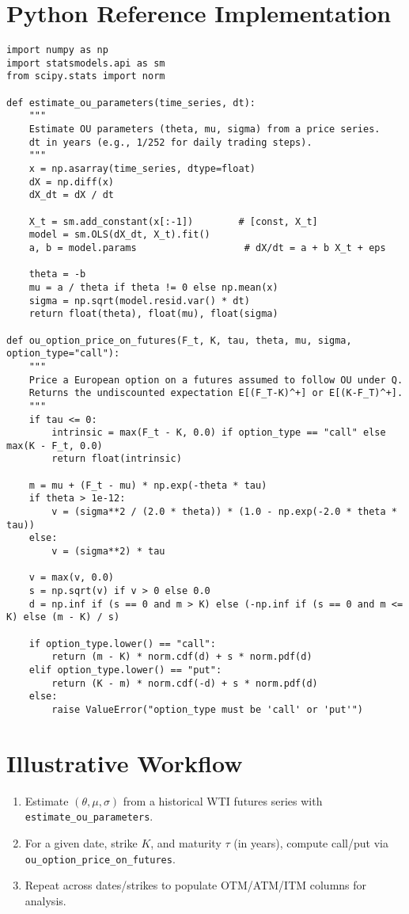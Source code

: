 \documentclass[12pt]{article}
\begin{document}
\section{Python Reference Implementation}
\begin{lstlisting}[caption=OU parameter estimation and option pricing on futures]
import numpy as np
import statsmodels.api as sm
from scipy.stats import norm

def estimate_ou_parameters(time_series, dt):
    """
    Estimate OU parameters (theta, mu, sigma) from a price series.
    dt in years (e.g., 1/252 for daily trading steps).
    """
    x = np.asarray(time_series, dtype=float)
    dX = np.diff(x)
    dX_dt = dX / dt

    X_t = sm.add_constant(x[:-1])        # [const, X_t]
    model = sm.OLS(dX_dt, X_t).fit()
    a, b = model.params                   # dX/dt = a + b X_t + eps

    theta = -b
    mu = a / theta if theta != 0 else np.mean(x)
    sigma = np.sqrt(model.resid.var() * dt)
    return float(theta), float(mu), float(sigma)

def ou_option_price_on_futures(F_t, K, tau, theta, mu, sigma, option_type="call"):
    """
    Price a European option on a futures assumed to follow OU under Q.
    Returns the undiscounted expectation E[(F_T-K)^+] or E[(K-F_T)^+].
    """
    if tau <= 0:
        intrinsic = max(F_t - K, 0.0) if option_type == "call" else max(K - F_t, 0.0)
        return float(intrinsic)

    m = mu + (F_t - mu) * np.exp(-theta * tau)
    if theta > 1e-12:
        v = (sigma**2 / (2.0 * theta)) * (1.0 - np.exp(-2.0 * theta * tau))
    else:
        v = (sigma**2) * tau

    v = max(v, 0.0)
    s = np.sqrt(v) if v > 0 else 0.0
    d = np.inf if (s == 0 and m > K) else (-np.inf if (s == 0 and m <= K) else (m - K) / s)

    if option_type.lower() == "call":
        return (m - K) * norm.cdf(d) + s * norm.pdf(d)
    elif option_type.lower() == "put":
        return (K - m) * norm.cdf(-d) + s * norm.pdf(d)
    else:
        raise ValueError("option_type must be 'call' or 'put'")
\end{lstlisting}

\section{Illustrative Workflow}
\begin{enumerate}
  \item Estimate $(\theta,\mu,\sigma)$ from a historical WTI futures series with \texttt{estimate\_ou\_parameters}.
  \item For a given date, strike $K$, and maturity $\tau$ (in years), compute call/put via \texttt{ou\_option\_price\_on\_futures}.
  \item Repeat across dates/strikes to populate OTM/ATM/ITM columns for analysis.
\end{enumerate}
\end{document}
